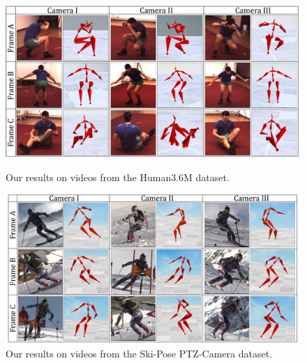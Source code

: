 
\begin{figure}[t]
\setlength{\abovecaptionskip}{5pt plus 3pt minus 2pt}
\setlength{\belowcaptionskip}{-5pt plus 3pt minus 2pt}
\centering
\begin{minipage}[b]{0.48\linewidth}
    \centering
    \includegraphics[width=\textwidth]{./images/H36M_results_big_font.pdf}
    \caption{Our results on videos from the Human3.6M dataset.}
    \label{fig:quality_h36}
\end{minipage}
\hfill
\begin{minipage}[b]{0.48\linewidth}
    \centering
    \includegraphics[width=\textwidth]{./images/Ski_results.pdf}
    \caption{Our results on videos from the Ski-Pose PTZ-Camera dataset.}
    \label{fig:ski_ptz_qualitative}
\end{minipage}
\end{figure}

